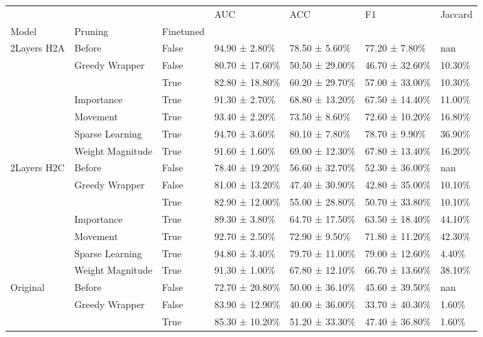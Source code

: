 \begin{tabular}{lllllll}
\toprule
 &  &  & AUC & ACC & F1 & Jaccard \\
Model & Pruning & Finetuned &  &  &  &  \\
\midrule
\multirow[t]{7}{*}{2Layers H2A} & Before & False & 94.90 ± 2.80\% & 78.50 ± 5.60\% & 77.20 ± 7.80\% & nan \\
\cline{2-7}
 & \multirow[t]{2}{*}{Greedy Wrapper} & False & 80.70 ± 17.60\% & 50.50 ± 29.00\% & 46.70 ± 32.60\% & 10.30\% \\
 &  & True & 82.80 ± 18.80\% & 60.20 ± 29.70\% & 57.00 ± 33.00\% & 10.30\% \\
\cline{2-7}
 & Importance & True & 91.30 ± 2.70\% & 68.80 ± 13.20\% & 67.50 ± 14.40\% & 11.00\% \\
\cline{2-7}
 & Movement & True & 93.40 ± 2.20\% & 73.50 ± 8.60\% & 72.60 ± 10.20\% & 16.80\% \\
\cline{2-7}
 & Sparse Learning & True & 94.70 ± 3.60\% & 80.10 ± 7.80\% & 78.70 ± 9.90\% & 36.90\% \\
\cline{2-7}
 & Weight Magnitude & True & 91.60 ± 1.60\% & 69.00 ± 12.30\% & 67.80 ± 13.40\% & 16.20\% \\
\cline{1-7} \cline{2-7}
\multirow[t]{7}{*}{2Layers H2C} & Before & False & 78.40 ± 19.20\% & 56.60 ± 32.70\% & 52.30 ± 36.00\% & nan \\
\cline{2-7}
 & \multirow[t]{2}{*}{Greedy Wrapper} & False & 81.00 ± 13.20\% & 47.40 ± 30.90\% & 42.80 ± 35.00\% & 10.10\% \\
 &  & True & 82.90 ± 12.00\% & 55.00 ± 28.80\% & 50.70 ± 33.80\% & 10.10\% \\
\cline{2-7}
 & Importance & True & 89.30 ± 3.80\% & 64.70 ± 17.50\% & 63.50 ± 18.40\% & 44.10\% \\
\cline{2-7}
 & Movement & True & 92.70 ± 2.50\% & 72.90 ± 9.50\% & 71.80 ± 11.20\% & 42.30\% \\
\cline{2-7}
 & Sparse Learning & True & 94.80 ± 3.40\% & 79.70 ± 11.00\% & 79.00 ± 12.60\% & 4.40\% \\
\cline{2-7}
 & Weight Magnitude & True & 91.30 ± 1.00\% & 67.80 ± 12.10\% & 66.70 ± 13.60\% & 38.10\% \\
\cline{1-7} \cline{2-7}
\multirow[t]{7}{*}{Original} & Before & False & 72.70 ± 20.80\% & 50.00 ± 36.10\% & 45.60 ± 39.50\% & nan \\
\cline{2-7}
 & \multirow[t]{2}{*}{Greedy Wrapper} & False & 83.90 ± 12.90\% & 40.00 ± 36.00\% & 33.70 ± 40.30\% & 1.60\% \\
 &  & True & 85.30 ± 10.20\% & 51.20 ± 33.30\% & 47.40 ± 36.80\% & 1.60\% \\

\end{tabular}
